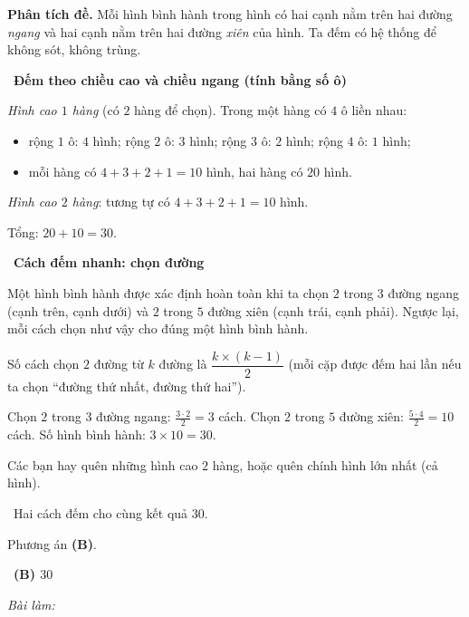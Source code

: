 \documentclass[11pt]{article}
\newif\ifsol \solfalse
\providecommand{\AnsWord}{Đáp số}
\newcommand{\ans}[1]{\par\smallskip{\bfseries\color{tmGreen!88!black}\AnsWord:}\ {\bfseries\color{AnsRed}#1}\par}
\newcommand{\probsol}[1]{%
  \begin{lrbox}{\solmeasure}\begin{minipage}{\dimexpr\linewidth-24pt\relax}#1\end{minipage}\end{lrbox}%
  \ifsol
    \begin{solbox}#1\end{solbox}%
  \else
    \setlength{\solht}{\dimexpr\ht\solmeasure+\dp\solmeasure+0.85cm\relax}%
    \ifdim\solht<1.35cm\setlength{\solht}{1.35cm}\fi
    \ifdim\solht>\StudentMaxWork\setlength{\solht}{\StudentMaxWork}\fi
    \begin{tcolorbox}[colback=white,colframe=Line,boxrule=0.8pt,arc=5pt,
      left=8pt,right=8pt,top=4pt,bottom=4pt,height=\solht]{\footnotesize\color{Slate}\itshape\WorkWord}\end{tcolorbox}%
  \fi}
\newlength{\StudentMaxWork}\setlength{\StudentMaxWork}{7.5cm}
\newcommand{\step}[2]{\par\smallskip\noindent{\bfseries\color{tmBlue!85!black}\StepWord~#1.}\ {\bfseries #2}\par\nopagebreak}
\newcommand{\verify}[1]{\par\smallskip\noindent{\bfseries\color{tmGreen!80!black}\faCheckCircle\ \CheckWord}\ #1\par}
\def\WorkWord{Bài làm:}
\def\AnsWord{Đáp số}
\def\StepWord{Bước}
\def\CheckWord{Thử lại:}
\begin{document}
\probsol{
\textbf{Phân tích đề.} Mỗi hình bình hành trong hình có hai cạnh nằm trên hai đường \emph{ngang} và hai cạnh
nằm trên hai đường \emph{xiên} của hình. Ta đếm có hệ thống để không sót, không trùng.

\step{1}{Đếm theo chiều cao và chiều ngang (tính bằng số ô)}
\emph{Hình cao $1$ hàng} (có $2$ hàng để chọn). Trong một hàng có $4$ ô liền nhau:
\begin{itemize}[leftmargin=1.4em,itemsep=1pt]
\item rộng $1$ ô: $4$ hình; rộng $2$ ô: $3$ hình; rộng $3$ ô: $2$ hình; rộng $4$ ô: $1$ hình;
\item mỗi hàng có $4+3+2+1=10$ hình, hai hàng có $20$ hình.
\end{itemize}
\emph{Hình cao $2$ hàng}: tương tự có $4+3+2+1=10$ hình.

Tổng: $20+10=30$.

\step{2}{Cách đếm nhanh: chọn đường}
\begin{proofbox}Một hình bình hành được xác định hoàn toàn khi ta chọn $2$ trong $3$ đường ngang (cạnh trên,
cạnh dưới) và $2$ trong $5$ đường xiên (cạnh trái, cạnh phải). Ngược lại, mỗi cách chọn như vậy cho đúng một
hình bình hành.\end{proofbox}
\begin{recallbox}Số cách chọn $2$ đường từ $k$ đường là $\dfrac{k\times(k-1)}{2}$ (mỗi cặp được đếm hai lần
nếu ta chọn ``đường thứ nhất, đường thứ hai'').\end{recallbox}
Chọn $2$ trong $3$ đường ngang: $\tfrac{3\cdot 2}{2}=3$ cách. Chọn $2$ trong $5$ đường xiên:
$\tfrac{5\cdot4}{2}=10$ cách. Số hình bình hành: $3\times 10=30$.

\begin{warnbox}Các bạn hay quên những hình cao $2$ hàng, hoặc quên chính hình lớn nhất (cả hình).\end{warnbox}
\verify{Hai cách đếm cho cùng kết quả $30$.}
Phương án \textbf{(B)}.
\ans{(B) $30$}
}
\end{document}
